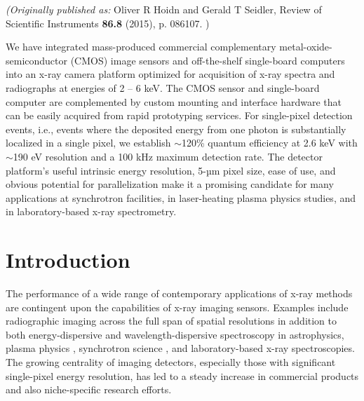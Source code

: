 \emph{(Originally published as: }
Oliver R Hoidn and Gerald T Seidler, Review of Scientific Instruments {\bfseries 86.8}
(2015), p. 086107.
)

\begin{addmargin}[4em]{1em}
We have integrated mass-produced commercial complementary
metal-oxide-semiconductor (CMOS) image sensors and off-the-shelf
single-board computers into an x-ray camera platform optimized for
acquisition of x-ray spectra and radiographs at energies of 2 -- 6 keV.
The CMOS sensor and single-board computer are complemented by custom
mounting and interface hardware that can be easily acquired from rapid
prototyping services. For single-pixel detection events, i.e., events
where the deposited energy from one photon is substantially localized in
a single pixel, we establish $\sim$120\% quantum efficiency at
2.6 keV with $\sim$190 eV resolution and a 100 kHz maximum
detection rate. The detector platform's useful intrinsic energy
resolution, 5-µm pixel size, ease of use, and obvious potential for parallelization make
it a promising candidate for many applications at synchrotron
facilities, in laser-heating plasma physics studies, and in
laboratory-based x-ray spectrometry.
\end{addmargin}


\section{Introduction}
The performance of a wide range of contemporary applications of x-ray
methods are contingent upon the capabilities of x-ray imaging sensors.
Examples include radiographic imaging across the full span of spatial
resolutions in addition to both energy-dispersive and
wavelength-dispersive spectroscopy in
astrophysics, plasma
physics \cite{PLATEAU2012LOW}, synchrotron
science \cite{HUOTARI2005IMPROVING}, and
laboratory-based x-ray
spectroscopies. The
growing centrality of imaging detectors, especially those with
significant single-pixel energy resolution, has led to a steady increase
in commercial products and also niche-specific research efforts.

